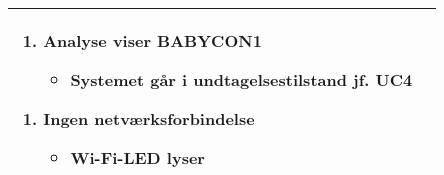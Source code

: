 \begin{center}
\begin{longtable}{|p{5cm}|p{9cm}|}
\begin{enumerate}[label=\ref{kravspec:uc3_lydanalyse}.c]
\begin{itemize}
					\end{itemize}
			\end{enumerate}
			\begin{enumerate}[label=\ref{kravspec:uc3_lydanalyse}.d]
			\item Analyse viser BABYCON1
					\begin{itemize}
					\item Systemet går i undtagelsestilstand jf. UC4
					\end{itemize}
			\end{enumerate}
			\begin{enumerate}[label=\ref{kravspec:uc3_opdatering}.a]
			\item Ingen netværksforbindelse
					\begin{itemize}				
						\item Wi-Fi-LED lyser
					\end{itemize}
			\end{enumerate}
		\\\hline
	\end{longtable} 
\end{center}

